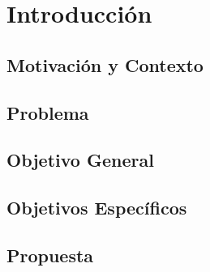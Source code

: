 \chapter{Introducci\'on}




\section{Motivación y Contexto}





\section{Problema}
\section{Objetivo General}
\section{Objetivos Específicos}
\section{Propuesta}






